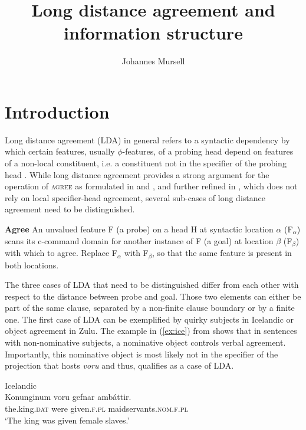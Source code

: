 \documentclass[output=paper
,modfonts
,nonflat]{langsci/langscibook}
\title{Long distance agreement and information structure}
\author{Johannes Mursell\affiliation{Goethe University Frankfurt}}
\begin{document}
\maketitle

\section{Introduction} 
Long distance agreement (LDA) in general refers to a syntactic dependency by which certain features, usually $ \phi $-features, of a probing head depend on features of a non-local constituent, i.e. a constituent not in the specifier of the probing head \citep{Bhatt_Keine2016}. While long distance agreement provides a strong argument for the operation of \textsc{agree} as formulated in \citet{Chomsky2000} and \citet{Chomsky2001}, and further refined in \citet{Pesetsky_Torrego2007}, which does not rely on local specifier-head agreement, several sub-cases of long distance agreement need to be distinguished.
\begin{exe} 
\ex \label{def:agr_pt} \textbf{Agree} \citep[][268]{Pesetsky_Torrego2007}
	\xlist
	\ex An unvalued feature F (a probe) on a head H at syntactic location $\alpha$ (F$_{\alpha}$) scans its c-command domain for another instance of F (a goal) at location $\beta$ (F$_{\beta}$) with which to agree. 
	\ex Replace F$_{\alpha}$ with F$_{\beta}$, so that the same feature is present in both locations.
	\endxlist
\end{exe}
The three cases of LDA that need to be distinguished differ from each other with respect to the distance between probe and goal. Those two elements can either be part of the same clause, separated by a non-finite clause boundary or by a finite one. The first case of LDA can be exemplified by quirky subjects in Icelandic or object agreement in Zulu. The example in (\ref{ex:ice}) from \citet{Zaenen_et_al1985} shows that in sentences with non-nominative subjects, a nominative object controls verbal agreement. Importantly, this nominative object is most likely not in the specifier of the projection that hosts \textit{voru} and thus, qualifies as a case of LDA.
\begin{exe} 
\ex Icelandic \citep[][460]{Zaenen_et_al1985}\label{ex:ice}\\ 
	\gll Konunginum voru gefnar amb\'{a}ttir.\\
	 the.king.\textsc{dat} were given.\textsc{f.pl} maidservants.\textsc{nom.f.pl}\\
	\glt `The king was given female slaves.'
\end{exe}
\end{document}
